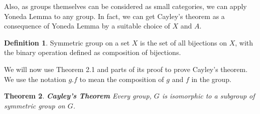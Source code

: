 \documentclass[a4paper]{article}
\newtheorem{theorem}{Theorem}[section]
\theoremstyle{definition}
\newtheorem{definition}[theorem]{Definition}
\begin{document}
		Also, as groups themselves can be considered as small categories, we can apply Yoneda Lemma to any
		group. In fact, we can get Cayley's theorem as a consequence of Yoneda Lemma by a suitable
		choice of $X$ and $A$.
		\begin{definition} %
			Symmetric group on a set $X$ is the set of all bijections on $X$, with the binary operation
			defined as composition of bijections.
		\end{definition}
		We will now use Theorem 2.1 and parts of its proof to prove Cayley's theorem.
		We use the notation $g.f$ to mean the composition of $g$ and $f$ in the group.
		\begin{theorem}{\textbf{Cayley's Theorem}} %
			Every group, $G$ is isomorphic to a subgroup of symmetric group on $G$.
		\end{theorem}
\end{document}
